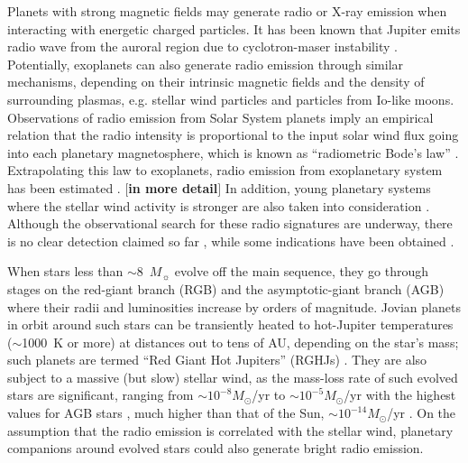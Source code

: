 \documentclass{emulateapj}
\def\memoYF#1{\color{red}$[${\bf #1}$]$ \color{black}}
\begin{document}
Planets with strong magnetic fields may generate radio or X-ray emission when interacting with energetic charged particles. 
It has been known that Jupiter emits radio wave from the auroral region due to cyclotron-maser instability \citep{zarka1998}.  %
Potentially, exoplanets can also generate radio emission through similar mechanisms, depending on their intrinsic magnetic fields and the density of surrounding plasmas, e.g. stellar wind particles and particles from Io-like moons. 
Observations of radio emission from Solar System planets imply an empirical relation that the radio intensity is proportional to the input solar wind flux going into each planetary magnetosphere, which is known as  ``radiometric Bode's law'' \citep{desch+kaiser1984}. 
Extrapolating this law to exoplanets, radio emission from exoplanetary system has been estimated \citep{farrell1999,zarka2001,lazio2004,griesmeier2004,griesmeier2005,stevens2005,griesmeier2007a,griesmeier2007b,jardine2008,reiners2010}. \memoYF{in more detail}
In addition, young planetary systems where the stellar wind activity is stronger are also taken into consideration \citep{griesmeier2005}. 
Although the observational search for these radio signatures are underway, there is no clear detection claimed so far
\citep{bastian2000,george2007,stroe2012,hallinan2013,murphy2015}, 
while some indications have been obtained \citep{lecavelier_et_al2013,sirothia2014}. 

When stars less than $\sim$8~$M_\sun$ evolve off the main sequence,
they go through stages on the red-giant branch (RGB) and the
asymptotic-giant branch (AGB) where their radii and luminosities increase by orders of magnitude. 
Jovian planets in orbit around such stars can be transiently heated to hot-Jupiter temperatures ($\sim$1000~K or more) at distances out to tens of AU, depending on the star's mass; such planets are termed ``Red Giant Hot Jupiters'' (RGHJs) \citep{spiegel+madhusudhan2012}. 
They are also subject to a massive (but slow) stellar wind, as the mass-loss rate of such evolved stars are significant, ranging from $\sim  10^{-8} M_\odot$/yr to $\sim  10^{-5} M_\odot$/yr with the highest values for AGB stars \citep[e.g.,][]{reimers1975, schild1989, vassiliadis1993, schoier2001, vanloon2005}, much higher than that of the Sun, $\sim 10^{-14}M_\odot$/yr . 
On the assumption that the radio emission is correlated with the stellar wind, planetary companions around evolved stars could also generate bright radio emission. 
\end{document}

